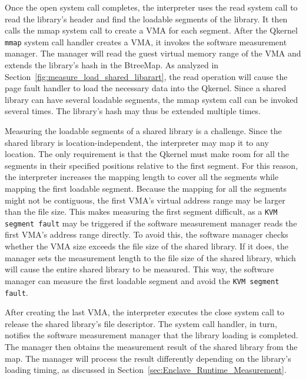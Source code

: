 Once the open system call completes, the interpreter uses the read system call to read the library's header and find the loadable segments of the library. It then calls the mmap system call to create a \acrshort{VMA} for each segment. After the Qkernel \texttt{mmap} system 
call handler creates a \acrshort{VMA}, it invokes the software measurement manager. The manager will read the guest virtual memory range of the \acrshort{VMA} and extends the library's hash in the BtreeMap. As analyzed in Section~\ref{fig:measure_load_shared_libarart}, the read operation will cause 
the page fault handler to load the necessary data into the Qkernel. Since a shared library can have several loadable segments, the mmap system call can be invoked several times. The library's hash may thus be extended multiple times.


Measuring the loadable segments of a shared library is a challenge. Since the shared library is location-independent, the interpreter may map it to any location. The only requirement is that the Qkernel must make room for all the segments in their specified positions relative to the first segment. 
For this reason, the interpreter increases the mapping length to cover all the segments while mapping the first loadable segment. Because the mapping for all the segments might not be contiguous, the first \acrshort{VMA}'s virtual address range may be larger than the file size. This makes measuring 
the first segment difficult, as a \texttt{KVM segment fault} may be triggered if the software measurement manager reads the first \acrshort{VMA}'s address range directly. To avoid this, the software manager checks whether the \acrshort{VMA} size exceeds the file size of the shared library. 
If it does, the manager sets the measurement length to the file size of the shared library, which will cause the entire shared library to be measured. This way, the software manager can measure the first loadable segment and avoid the \texttt{KVM segment fault}.



After creating the last \acrshort{VMA}, the interpreter executes the close system call to release the shared library's file descriptor. The system call handler, in turn, notifies the software measurement manager that the library loading is completed. The  manager then obtains the measurement 
result of the shared library from the map. The manager will process the result differently depending on the library's loading timing, as discussed in Section~\ref{sec:Enclave_Runtime_Measurement}.
